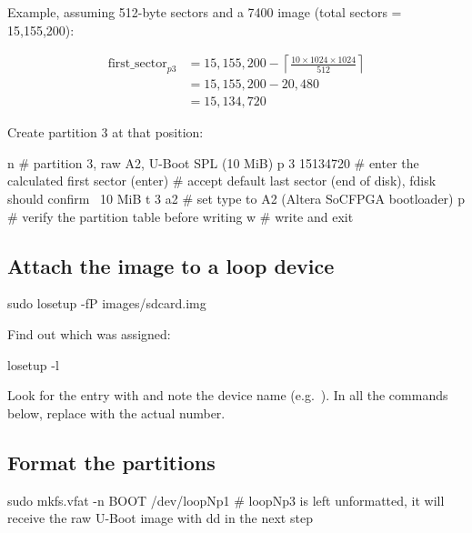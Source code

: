Example, assuming 512-byte sectors and a 7400  image (total sectors = 15{,}155{,}200):

\[
\begin{aligned}
\text{first\_sector}_{p3} &= 15{,}155{,}200 - \left\lceil \frac{10 \times 1024 \times 1024}{512} \right\rceil \\
&= 15{,}155{,}200 - 20{,}480 \\
&= 15{,}134{,}720
\end{aligned}
\]

Create partition 3 at that position:

\begin{shellcodehost}
n               # partition 3, raw A2, U-Boot SPL (10 MiB)
p
3
15134720        # enter the calculated first sector
(enter)         # accept default last sector (end of disk), fdisk should confirm ~10 MiB
t
3
a2              # set type to A2 (Altera SoCFPGA bootloader)
p               # verify the partition table before writing
w               # write and exit
\end{shellcodehost}

\subsection{Attach the image to a loop device}
\label{subsec:fpgasteel-attach-loop}

\begin{shellcodehost}
sudo losetup -fP images/sdcard.img
\end{shellcodehost}

Find out which  was assigned:

\begin{shellcodehost}
losetup -l
\end{shellcodehost}

Look for the entry with  and note the device name (e.g.\ ). In all the commands below, replace  with the actual number.

\subsection{Format the partitions}
\label{subsec:fpgasteel-format-partitions}

\begin{shellcodehost}
sudo mkfs.vfat -n BOOT /dev/loopNp1
# loopNp3 is left unformatted, it will receive the raw U-Boot image with dd in the next step
\end{shellcodehost}

